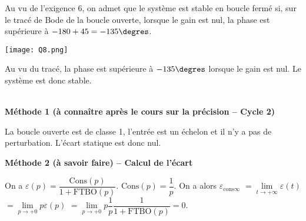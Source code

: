 \ifprof
\else
\begin{remarque}
Au vu de l'exigence 6, on admet que le système est stable en boucle fermé si, sur le tracé de Bode de la boucle ouverte, lorsque le gain est nul, la phase est supérieure à $-180+45=-135\degres$. 
\end{remarque}
\fi

\ifprof
\begin{center}
\texttt{[image: Q8.png]}
\end{center}
\begin{corrige}
Au vu du tracé, la phase est supérieure à $-135\degres$ lorsque le gain est nul. Le système est donc stable.
\end{corrige}
\else
\fi

% 


\ifprof
\begin{corrige}~\\
\textbf{Méthode 1 (à connaître après le cours sur la précision -- Cycle 2)}

La boucle ouverte est de classe 1, l'entrée est un échelon et il n'y a pas de perturbation. L'écart statique est donc nul.


\textbf{Méthode 2 (à savoir faire) -- Calcul de l'écart}

On a $\varepsilon(p)=\dfrac{\text{Cons}(p)}{1+\text{FTBO}(p)}$. $\text{Cons}(p)=\dfrac{1}{p}$.
On a alors 
$\varepsilon_{\text{cons} \infty} $
$= \lim\limits_{t\to+\infty} \varepsilon(t)$ 
$ = \lim\limits_{p\to+0} p\varepsilon(p)$ 
$ = \lim\limits_{p\to+0} p\dfrac{1}{p}\dfrac{1}{1+\text{FTBO}(p)}=0$.
 



\end{corrige}
\else
\fi


